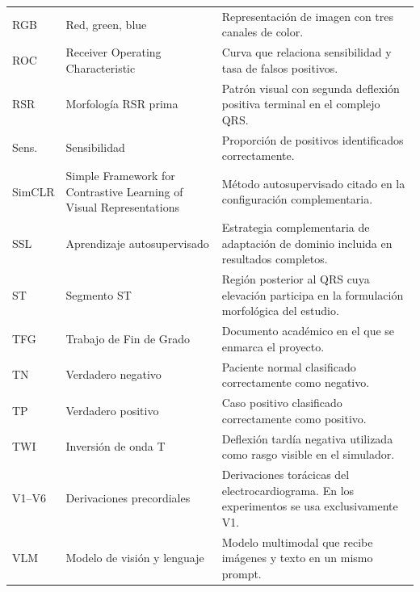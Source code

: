 {\begin{longtable}{@{}>{\raggedright\arraybackslash}p{2.20cm}>{\raggedright\arraybackslash}p{4.10cm}>{\raggedright\arraybackslash}p{7.95cm}@{}}
RGB & Red, green, blue & Representación de imagen con tres canales de color. \\
ROC & Receiver Operating Characteristic & Curva que relaciona sensibilidad y tasa de falsos positivos. \\
RSR & Morfología RSR prima & Patrón visual con segunda deflexión positiva terminal en el complejo QRS. \\
Sens. & Sensibilidad & Proporción de positivos identificados correctamente. \\
SimCLR & Simple Framework for Contrastive Learning of Visual Representations & Método autosupervisado citado en la configuración complementaria. \\
SSL & Aprendizaje autosupervisado & Estrategia complementaria de adaptación de dominio incluida en resultados completos. \\
ST & Segmento ST & Región posterior al QRS cuya elevación participa en la formulación morfológica del estudio. \\
TFG & Trabajo de Fin de Grado & Documento académico en el que se enmarca el proyecto. \\
TN & Verdadero negativo & Paciente normal clasificado correctamente como negativo. \\
TP & Verdadero positivo & Caso positivo clasificado correctamente como positivo. \\
TWI & Inversión de onda T & Deflexión tardía negativa utilizada como rasgo visible en el simulador. \\
V1--V6 & Derivaciones precordiales & Derivaciones torácicas del electrocardiograma. En los experimentos se usa exclusivamente V1. \\
VLM & Modelo de visión y lenguaje & Modelo multimodal que recibe imágenes y texto en un mismo prompt. \\
\end{longtable}
}
